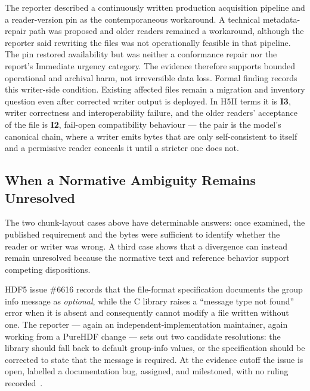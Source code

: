 \documentclass[../main.tex]{subfiles}
\begin{document}
The reporter described a continuously written production acquisition pipeline
and a reader-version pin as the contemporaneous workaround. A technical metadata-
repair path was proposed and older readers remained a workaround, although the
reporter said rewriting the files was not operationally feasible in that
pipeline. The pin restored availability but was neither a conformance repair
nor the report's Immediate urgency category. The evidence therefore supports
bounded operational and archival
harm, not irreversible data loss. Formal finding  records
this writer-side condition. Existing affected files remain a migration and
inventory question even after corrected writer output is deployed. In H5II
terms it is \textbf{I3}, writer correctness and interoperability failure, and
the older readers' acceptance of the file is \textbf{I2}, fail-open
compatibility behaviour --- the pair is the model's canonical chain, where a
writer emits bytes that are only self-consistent to itself and a permissive
reader conceals it until a stricter one does not.


\subsection{When a Normative Ambiguity Remains Unresolved}

The two chunk-layout cases above have determinable answers: once examined, the
published requirement and the bytes were sufficient to identify whether the
reader or writer was wrong. A third case shows that a divergence can instead
remain unresolved because the normative text and reference behavior support
competing dispositions.

HDF5 issue \#6616 records that the file-format specification documents the
group info message as \emph{optional}, while the C library raises a ``message
type not found'' error when it is absent and consequently cannot modify a file
written without one. The reporter --- again an independent-implementation
maintainer, again working from a PureHDF change --- sets out two candidate
resolutions: the library should fall back to default group-info values, or the
specification should be corrected to state that the message is required. At the
evidence cutoff the issue is open, labelled a documentation bug, assigned, and
milestoned, with no ruling recorded~\cite{hdf5-gh-issue-6616}.
\end{document}

